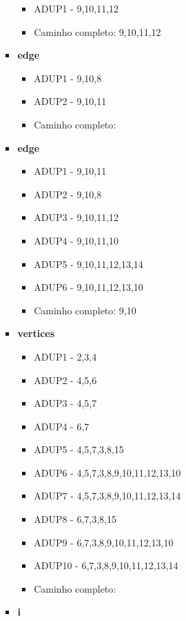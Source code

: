 \documentclass{article}
\begin{document}
\begin{itemize}
\begin{enumerate}
\begin{itemize}
        \begin{itemize}
            \item ADUP1 - 9,10,11,12
            \item Caminho completo: 9,10,11,12
        \end{itemize}
        \item \textbf{edge}
        \begin{itemize}
            \item ADUP1 - 9,10,8
            \item ADUP2 - 9,10,11
            \item Caminho completo:
        \end{itemize}
        \item \textbf{edge}
        \begin{itemize}
            \item ADUP1 - 9,10,11
            \item ADUP2 - 9,10,8
            \item ADUP3 - 9,10,11,12
            \item ADUP4 - 9,10,11,10
            \item ADUP5 - 9,10,11,12,13,14
            \item ADUP6 - 9,10,11,12,13,10
            \item Caminho completo: 9,10
        \end{itemize}
        \item \textbf{vertices}
        \begin{itemize}
            \item ADUP1 - 2,3,4
            \item ADUP2 - 4,5,6
            \item ADUP3 - 4,5,7
            \item ADUP4 - 6,7
            \item ADUP5 - 4,5,7,3,8,15
            \item ADUP6 - 4,5,7,3,8,9,10,11,12,13,10
            \item ADUP7 - 4,5,7,3,8,9,10,11,12,13,14
            \item ADUP8 - 6,7,3,8,15
            \item ADUP9 - 6,7,3,8,9,10,11,12,13,10
            \item ADUP10 - 6,7,3,8,9,10,11,12,13,14
            \item Caminho completo: 
        \end{itemize}
        \item \textbf{i}

\end{itemize}
\end{enumerate}
\end{itemize}
\end{document}
